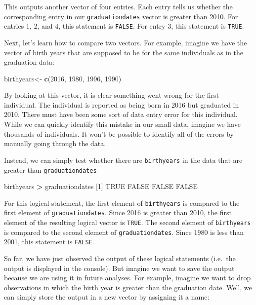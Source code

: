 \documentclass[
]{book}
\newenvironment{Shaded}{\begin{snugshade}}{\end{snugshade}}
\newcommand{\ConstantTok}[1]{\textcolor[rgb]{0.56,0.35,0.01}{#1}}
\newcommand{\DecValTok}[1]{\textcolor[rgb]{0.00,0.00,0.81}{#1}}
\newcommand{\FunctionTok}[1]{\textcolor[rgb]{0.13,0.29,0.53}{\textbf{#1}}}
\newcommand{\NormalTok}[1]{#1}
\newcommand{\OtherTok}[1]{\textcolor[rgb]{0.56,0.35,0.01}{#1}}
\newcommand{\SpecialCharTok}[1]{\textcolor[rgb]{0.81,0.36,0.00}{\textbf{#1}}}
\begin{document}
This outputs another vector of four entries. Each entry tells us whether the corresponding entry in our \texttt{graduationdates} vector is greater than 2010. For entries 1, 2, and 4, this statement is \texttt{FALSE}. For entry 3, this statement is \texttt{TRUE}.

Next, let's learn how to compare two vectors. For example, imagine we have the vector of birth years that are supposed to be for the same individuals as in the graduation data:

\begin{Shaded}
\begin{Highlighting}[]
\NormalTok{birthyears}\OtherTok{\textless{}{-}} \FunctionTok{c}\NormalTok{(}\DecValTok{2016}\NormalTok{, }\DecValTok{1980}\NormalTok{, }\DecValTok{1996}\NormalTok{, }\DecValTok{1990}\NormalTok{)}
\end{Highlighting}
\end{Shaded}

By looking at this vector, it is clear something went wrong for the first individual. The individual is reported as being born in 2016 but graduated in 2010. There must have been some sort of data entry error for this individual. While we can quickly identify this mistake in our small data, imagine we have thousands of individuals. It won't be possible to identify all of the errors by manually going through the data.

Instead, we can simply test whether there are \texttt{birthyears} in the data that are greater than \texttt{graduationdates}

\begin{Shaded}
\begin{Highlighting}[]
\NormalTok{birthyears }\SpecialCharTok{\textgreater{}}\NormalTok{ graduationdates}
\NormalTok{[}\DecValTok{1}\NormalTok{]  }\ConstantTok{TRUE} \ConstantTok{FALSE} \ConstantTok{FALSE} \ConstantTok{FALSE}
\end{Highlighting}
\end{Shaded}

For this logical statement, the first element of \texttt{birthyears} is compared to the first element of \texttt{graduationdates}. Since 2016 is greater than 2010, the first element of the resulting logical vector is \texttt{TRUE}. The second element of \texttt{birthyears} is compared to the second element of \texttt{graduationdates}. Since 1980 is less than 2001, this statement is \texttt{FALSE}.

So far, we have just observed the output of these logical statements (i.e.~the output is displayed in the console). But imagine we want to save the output because we are using it in future analyses. For example, imagine we want to drop observations in which the birth year is greater than the graduation date. Well, we can simply store the output in a new vector by assigning it a name:
\end{document}
